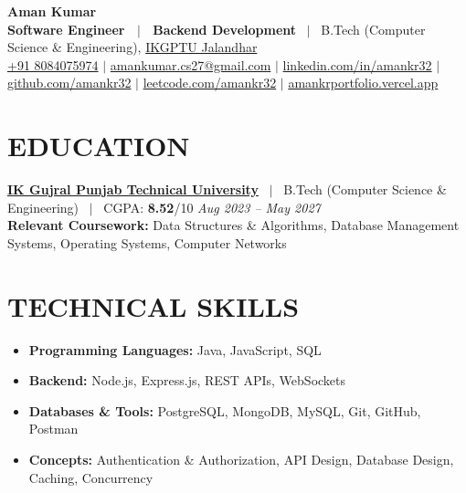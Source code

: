 \documentclass[10.5pt,letterpaper]{article}
\begin{document}
{\Huge \bfseries Aman Kumar}\\[3pt]
\textbf{Software Engineer \ $|$ \ Backend Development} \ $|$ \ B.Tech (Computer Science \& Engineering), \href{https://ptu.ac.in/}{IKGPTU Jalandhar} \\[2pt]
{\small
\href{tel:+918084075974}{+91 8084075974} $|$
\href{mailto:amankumar.cs27@gmail.com}{amankumar.cs27@gmail.com} $|$
\href{https://linkedin.com/in/amankr32}{linkedin.com/in/amankr32} $|$
\href{https://github.com/amankr32}{github.com/amankr32} $|$
\href{https://leetcode.com/amankr32}{leetcode.com/amankr32} $|$
\href{https://amankrportfolio.vercel.app/}{amankrportfolio.vercel.app}
}
\vspace{-8pt}


\section*{EDUCATION}
\href{https://ptu.ac.in/}{\textbf{IK Gujral Punjab Technical University}} \ $|$ \ B.Tech (Computer Science \& Engineering) \ $|$ \ CGPA: \textbf{8.52}/10 \hfill \textit{Aug 2023 -- May 2027}\\
\textbf{Relevant Coursework:} Data Structures \& Algorithms, Database Management Systems, Operating Systems, Computer Networks 

\section*{TECHNICAL SKILLS}
\begin{itemize}
    \item \textbf{Programming Languages:} Java, JavaScript, SQL
    \item \textbf{Backend:} Node.js, Express.js, REST APIs, WebSockets
    \item \textbf{Databases \& Tools:} PostgreSQL, MongoDB, MySQL, Git, GitHub, Postman
    \item \textbf{Concepts:} Authentication \& Authorization, API Design, Database Design, Caching, Concurrency
\end{itemize}
\end{document}

